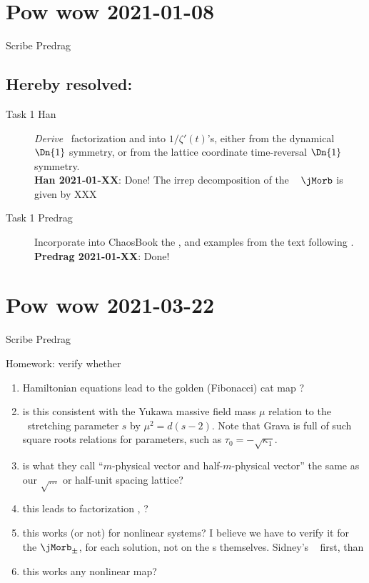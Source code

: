 \section{Pow wow 2021-01-08}
\label{sect:pw20210108}

Scribe Predrag
\begin{description}
\end{description}

\subsection{Hereby resolved:}
\begin{description}
\item[Task 1 Han]
\emph{Derive} \templatt\ factorization  and
 into ${1}/{\zeta'(t)}$'s, either from the dynamical
$\Dn{1}$ symmetry, or from the lattice coordinate time-reversal $\Dn{1}$
symmetry.
\\
\textbf{Han 2021-01-XX}: Done!
The  irrep decomposition of the \templatt\  {\jacobianOrb}
$\jMorb$ is given by XXX %

\item[Task 1 Predrag]
Incorporate into ChaosBook the ,  and  examples
from the text following .
\\
\textbf{Predrag 2021-01-XX}: Done!

\end{description}

\section{Pow wow 2021-03-22}
\label{sect:pw2021-03-22}

Scribe Predrag
\medskip

Homework: verify whether
\begin{enumerate}
  \item
Hamiltonian  equations lead to the
golden (Fibonacci) cat map ?
  \item
is this consistent with the
Yukawa massive field mass ${\mu}$ relation 
to the \catlatt\
stretching parameter ${s}$ by ${\mu}^2=d(s-2)$. Note that
Grava \etal{}  is full of such
square roots relations for parameters, such as $\tau_0=-\sqrt{\kappa_1}$.
  \item
is what they call ``$m$-physical vector and half-$m$-physical vector''
the same as our $\sqrt{...}$ or half-unit spacing lattice?
  \item
this leads to factorization , ?
  \item
this works (or not) for nonlinear systems?
I believe we have to verify it for the {\jacobianOrb} $\jMorb_{\pm}$,
for each solution, not on the {\lattstate}s themselves.
Sidney's \Henon\  first, than
  \item
this works any nonlinear map?
\end{enumerate}


